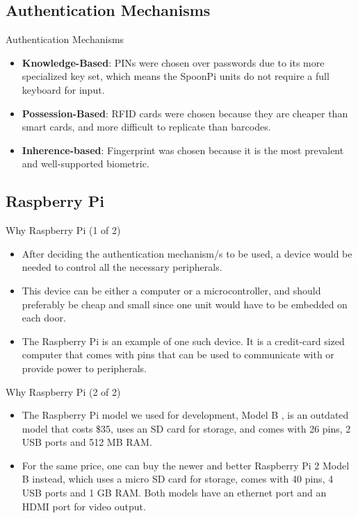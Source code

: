 \subsection{Authentication Mechanisms}
\begin{frame}{Authentication Mechanisms}
\begin{itemize}
    \item<1-> \textbf{Knowledge-Based}: PINs were chosen over passwords due to its more specialized key set, which means the SpoonPi units do not require a full keyboard for input.
    \item<2-> \textbf{Possession-Based}: RFID cards were chosen because they are cheaper than smart cards, and more difficult to replicate than barcodes.
    \item<3-> \textbf{Inherence-based}: Fingerprint was chosen because it is the most prevalent and well-supported biometric.
\end{itemize}
\end{frame}

\subsection{Raspberry Pi}
\begin{frame}{Why Raspberry Pi (1 of 2)}
\begin{itemize}
    \item<1-> After deciding the authentication mechanism/s to be used, a device would be needed to control all the necessary peripherals.
    \item<2-> This device can be either a computer or a microcontroller, and should preferably be cheap and small since one unit would have to be embedded on each door.
    \item<3-> The Raspberry Pi is an example of one such device. It is a credit-card sized computer that comes with pins that can be used to communicate with or provide power to peripherals.
\end{itemize}
\end{frame}

\begin{frame}{Why Raspberry Pi (2 of 2)}
\begin{itemize}
    \item<1->  The Raspberry Pi model we used for development, Model B , is an outdated model that costs \$35, uses an SD card for storage, and comes with 26 pins, 2 USB ports and 512 MB RAM.
    \item<2-> For the same price, one can buy the newer and better Raspberry Pi 2 Model B  instead, which uses a micro SD card for storage, comes with 40 pins, 4 USB ports and 1 GB RAM. Both models have an ethernet port and an HDMI port for video output.
\end{itemize}
\end{frame}